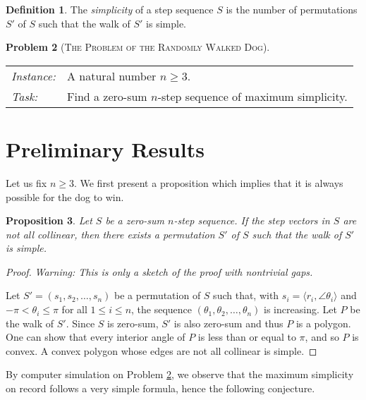 \documentclass{amsart}
\newtheorem{proposition}{Proposition}[section]
\theoremstyle{definition}
\newtheorem{definition}[proposition]{Definition}
\theoremstyle{problem}
\newtheorem{problem}[proposition]{Problem}
\theoremstyle{remark}
\begin{document}
\begin{definition}
    The \emph{simplicity} of a step sequence $S$
    is the number of permutations $S'$ of $S$
    such that the walk of $S'$ is simple.
\end{definition}

\begin{problem}[\textsc{The Problem of the Randomly Walked Dog}]
\label{problem:rwd}
\begin{framed}
    \begin{tabular}{@{}ll}
        \textit{Instance:} &
        A natural number $n\ge3$. \\

        \textit{Task:}     &
        Find a zero-sum $n$-step sequence of maximum simplicity.
    \end{tabular}
    \vskip -2pt
\end{framed}
\end{problem}

\section{Preliminary Results}

Let us fix $n\ge3$. We first present a proposition which
implies that it is always possible for the dog to win.


\begin{proposition}
    Let $S$ be a zero-sum $n$-step sequence. If the step vectors in $S$ are not all collinear,
    then there exists a permutation $S'$ of $S$ such that the walk of $S'$ is simple.
\end{proposition}

\begin{proof}
    \emph{Warning: This is only a sketch of the proof with nontrivial gaps.}

    Let $S'=(s_1,s_2,\dots,s_n)$ be a permutation of $S$ such that, with
    $s_i=\langle r_i,\angle\theta_i\rangle$ and $-\pi<\theta_i\le\pi$ for all $1\le i\le n$,
    the sequence $(\theta_1,\theta_2,\dots,\theta_n)$ is increasing.
    Let $P$ be the walk of $S'$. Since $S$ is zero-sum, $S'$ is also zero-sum and thus $P$
    is a polygon. One can show that every interior angle of $P$ is less than
    or equal to $\pi$, and so $P$ is convex.
    A convex polygon whose edges are not all collinear is simple.
\end{proof}

By computer simulation on Problem \ref{problem:rwd}, we observe that the maximum
simplicity on record follows a very simple formula, hence the following conjecture.
\end{document}
